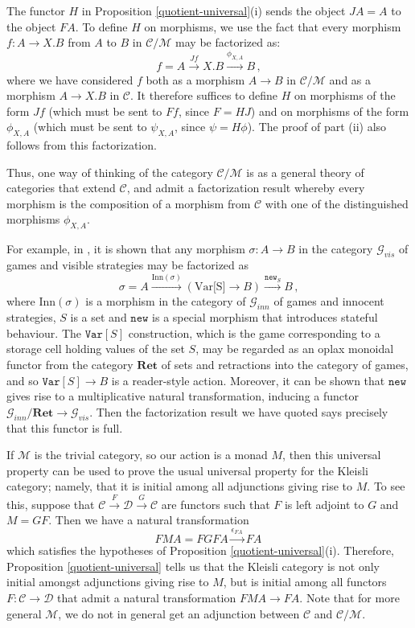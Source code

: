 \documentclass{svproc}
\newcommand\C{\mathcal{C}}
\newcommand\D{\mathcal{D}}
\newcommand\G{\mathcal{G}}
\newcommand\M{\mathcal{M}}
\newcommand*\from{\colon}
\newcommand{\0}{{\mathtt{0}}} \newcommand{\com}{{\mathtt{com}}}
\newcommand{\Var}{{\mathtt{Var}}}
\newcommand{\new}{{\mathtt{new}}}
\newcommand{\catname}[1]{\mathbf{#1}}
\newcommand{\Ret}{\catname{Ret}}
\begin{document}
\begin{remark}
  The functor $H$ in Proposition \ref{quotient-universal}(i) sends the object $JA=A$ to the object $FA$.  
  To define $H$ on morphisms, we use the fact that every morphism $f\from A \to X.B$ from $A$ to $B$ in $\C/\M$ may be factorized as:
  \[
    f = A \xrightarrow{Jf}
    X.B \xrightarrow{\phi_{X,A}}
    B\,,
    \]
  where we have considered $f$ both as a morphism $A\to B$ in $\C/\M$ and as a morphism $A \to X.B$ in $\C$.  
  It therefore suffices to define $H$ on morphisms of the form $Jf$ (which must be sent to $Ff$, since $F=HJ$) and on morphisms of the form $\phi_{X,A}$ (which must be sent to $\psi_{X,A}$, since $\psi=H\phi$).  
  The proof of part (ii) also follows from this factorization.

  Thus, one way of thinking of the category $\C/\M$ is as a general theory of categories that extend $\C$, and admit a factorization result whereby every morphism is the composition of a morphism from $\C$ with one of the distinguished morphisms $\phi_{X,A}$.

  For example, in \cite{SamsonGuyIAPassive}, it is shown that any morphism $\sigma \from A\to B$ in the category $\G_{vis}$ of games and visible strategies may be factorized as
  \[
    \sigma = A \xrightarrow{\text{Inn}(\sigma)}
    (\text{Var[S]} \to B) \xrightarrow{\new_S}
    B\,,
    \]
  where $\text{Inn}(\sigma)$ is a morphism in the category of $\G_{inn}$ of games and innocent strategies, $S$ is a set and $\new$ is a special morphism that introduces stateful behaviour.  
  The $\Var[S]$ construction, which is the game corresponding to a storage cell holding values of the set $S$, may be regarded as an oplax monoidal functor from the category $\Ret$ of sets and retractions into the category of games, and so $\Var[S]\to B$ is a reader-style action.  
  Moreover, it can be shown that $\new$ gives rise to a multiplicative natural transformation, inducing a functor $\G_{inn}/\Ret\to \G_{vis}$.  
  Then the factorization result we have quoted says precisely that this functor is full.
\end{remark}
\begin{remark}
  If $\M$ is the trivial category, so our action is a monad $M$, then this universal property can be used to prove the usual universal property for the Kleisli category; namely, that it is initial among all adjunctions giving rise to $M$.  
  To see this, suppose that $\C \xrightarrow{F} \D \xrightarrow{G} \C$ are functors such that $F$ is left adjoint to $G$ and $M=GF$.  
  Then we have a natural transformation
  \[
    FMA = FGF A \xrightarrow{\epsilon_{F A}} F A\,
    \]
  which satisfies the hypotheses of Proposition \ref{quotient-universal}(i).  
  Therefore, Proposition \ref{quotient-universal} tells us that the Kleisli category is not only initial amongst adjunctions giving rise to $M$, but is initial among all functors $F\from \C \to \D$ that admit a natural transformation $FMA \to FA$.
  Note that for more general $\M$, we do not in general get an adjunction between $\C$ and $\C/\M$.
\end{remark}
\end{document}
